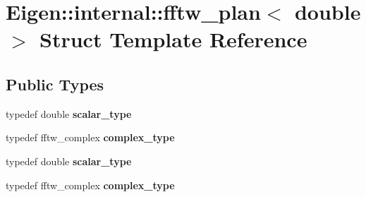 \hypertarget{struct_eigen_1_1internal_1_1fftw__plan_3_01double_01_4}{}\section{Eigen\+:\+:internal\+:\+:fftw\+\_\+plan$<$ double $>$ Struct Template Reference}
\label{struct_eigen_1_1internal_1_1fftw__plan_3_01double_01_4}
\subsection*{Public Types}
\begin{DoxyCompactItemize}
\item 
\mbox{\label{struct_eigen_1_1internal_1_1fftw__plan_3_01double_01_4_a112cdb0303d534669a43ae772323998f}} 
typedef double {\bfseries scalar\+\_\+type}
\item 
\mbox{\label{struct_eigen_1_1internal_1_1fftw__plan_3_01double_01_4_adca18bb5ffdf1cfa50ef97d070a4bc64}} 
typedef fftw\+\_\+complex {\bfseries complex\+\_\+type}
\item 
\mbox{\label{struct_eigen_1_1internal_1_1fftw__plan_3_01double_01_4_a112cdb0303d534669a43ae772323998f}} 
typedef double {\bfseries scalar\+\_\+type}
\item 
\mbox{\label{struct_eigen_1_1internal_1_1fftw__plan_3_01double_01_4_adca18bb5ffdf1cfa50ef97d070a4bc64}} 
typedef fftw\+\_\+complex {\bfseries complex\+\_\+type}
\end{DoxyCompactItemize}
